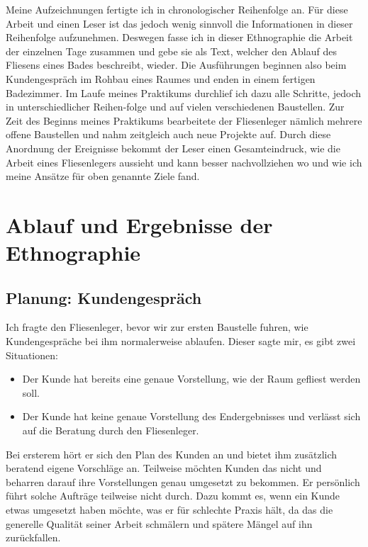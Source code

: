 Meine Aufzeichnungen fertigte ich in chronologischer Reihenfolge an. Für diese Arbeit und einen Leser ist das jedoch wenig sinnvoll die Informationen in dieser Reihenfolge aufzunehmen. Deswegen fasse ich in dieser Ethnographie die Arbeit der einzelnen Tage zusammen und gebe sie als Text, welcher den Ablauf des Fliesens eines Bades beschreibt, wieder. Die Ausführungen beginnen also beim Kundengespräch im Rohbau eines Raumes und enden in einem fertigen Badezimmer. Im Laufe meines Praktikums durchlief ich dazu alle Schritte, jedoch in unterschiedlicher Reihen-folge und auf vielen verschiedenen Baustellen. Zur Zeit des Beginns meines Praktikums bearbeitete der Fliesenleger nämlich mehrere offene Baustellen und nahm zeitgleich auch neue Projekte auf. Durch diese Anordnung der Ereignisse bekommt der Leser einen Gesamteindruck, wie die Arbeit eines Fliesenlegers aussieht und kann besser nachvollziehen wo und wie ich meine Ansätze für oben genannte Ziele fand.

\section{Ablauf und Ergebnisse der Ethnographie}

\subsection{Planung: Kundengespräch}

Ich fragte den Fliesenleger, bevor wir zur ersten Baustelle fuhren, wie Kundengespräche bei ihm normalerweise ablaufen. Dieser sagte mir, es gibt zwei Situationen:

\begin{itemize}
	\item Der Kunde hat bereits eine genaue Vorstellung, wie der Raum gefliest werden soll.
	\item Der Kunde hat keine genaue Vorstellung des Endergebnisses und verlässt sich auf die Beratung durch den Fliesenleger.
\end{itemize}

Bei ersterem hört er sich den Plan des Kunden an und bietet ihm zusätzlich beratend eigene Vorschläge an. Teilweise möchten Kunden das nicht und beharren darauf ihre Vorstellungen genau umgesetzt zu bekommen. Er persönlich führt solche Aufträge teilweise nicht durch. Dazu kommt es, wenn ein Kunde etwas umgesetzt haben möchte, was er für schlechte Praxis hält, da das die generelle Qualität seiner Arbeit schmälern und spätere Mängel auf ihn zurückfallen. 

